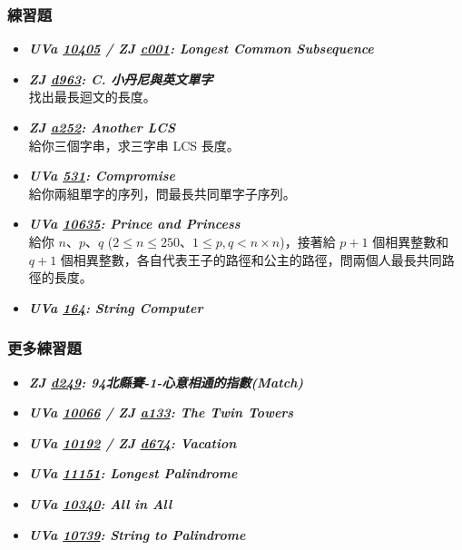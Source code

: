 \subsubsection*{練習題}
\begin{itemize}[label={\Checkmark}]
\item \textbf{\textit{UVa \href{http://uva.onlinejudge.org/external/104/10405.html}{10405} / ZJ \href{http://zerojudge.tw/ShowProblem?problemid=c001}{c001}: Longest Common Subsequence}}\\

\item \textbf{\textit{ZJ \href{http://zerojudge.tw/ShowProblem?problemid=d963}{d963}: C. 小丹尼與英文單字}}\\
找出最長迴文的長度。
\item \textbf{\textit{ZJ \href{http://zerojudge.tw/ShowProblem?problemid=a252}{a252}: Another LCS}}\\
給你三個字串，求三字串 LCS 長度。
\item \textbf{\textit{UVa \href{http://uva.onlinejudge.org/external/5/531.html}{531}: Compromise}}\\
給你兩組單字的序列，問最長共同單字子序列。
\item \textbf{\textit{UVa \href{http://uva.onlinejudge.org/external/106/10635.html}{10635}: Prince and Princess}}\\
給你 $n$、$p$、$q$ ($2\leq{n}\leq{250}$、$1\leq{p,q}<{n\times{n}}$)，接著給 $p+1$ 個相異整數和 $q+1$ 個相異整數，各自代表王子的路徑和公主的路徑，問兩個人最長共同路徑的長度。
\item \textbf{\textit{UVa \href{http://uva.onlinejudge.org/external/1/164.html}{164}: String Computer}}\\

\end{itemize}
\subsubsection*{更多練習題}
\begin{itemize}[label={\PencilLeftDown}]
\item \textbf{\textit{ZJ \href{http://zerojudge.tw/ShowProblem?problemid=d249}{d249}: 94北縣賽-1-心意相通的指數(Match)}}
\item \textbf{\textit{UVa \href{http://uva.onlinejudge.org/external/100/10066.html}{10066} / ZJ \href{http://zerojudge.tw/ShowProblem?problemid=a133}{a133}: The Twin Towers}}
\item \textbf{\textit{UVa \href{http://uva.onlinejudge.org/external/101/10192.html}{10192} / ZJ \href{http://zerojudge.tw/ShowProblem?problemid=d674}{d674}: Vacation}}
\item \textbf{\textit{UVa \href{http://uva.onlinejudge.org/external/111/11151.html}{11151}: Longest Palindrome}}
\item \textbf{\textit{UVa \href{http://uva.onlinejudge.org/external/103/10340.html}{10340}: All in All}}
\item \textbf{\textit{UVa \href{http://uva.onlinejudge.org/external/107/10739.html}{10739}: String to Palindrome}}
\end{itemize}